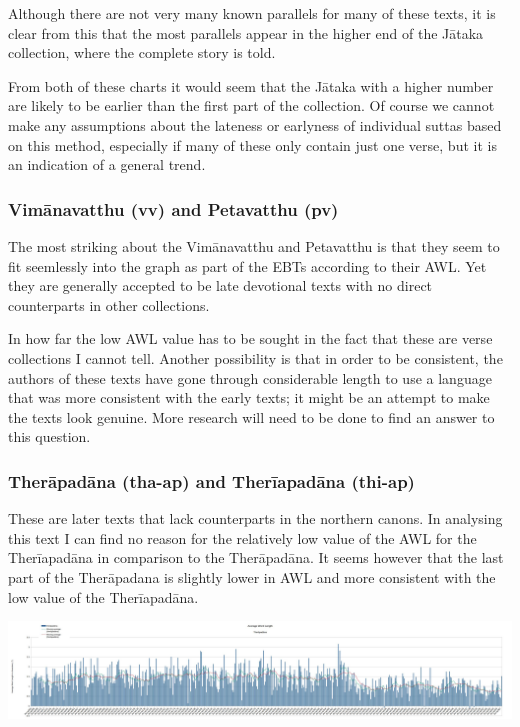 \medskip
Although there are not very many known parallels for many of these texts, it is clear from this that the most parallels appear in the higher end of the Jātaka collection, where the complete story is told.

From both of these charts it would seem that the Jātaka with a higher number are likely to be earlier than the first part of the collection. Of course we cannot make any assumptions about the lateness or earlyness of individual suttas based on this method, especially if many of these only contain just one verse, but it is an indication of a general trend.

\subsubsection{Vimānavatthu (vv) and Petavatthu (pv)}
The most striking about the Vimānavatthu and Petavatthu is that they seem to fit seemlessly into the graph as part of the EBTs according to their AWL. Yet they are generally accepted to be late devotional texts with no direct counterparts in other collections.

In how far the low AWL value has to be sought in the fact that these are verse collections I cannot tell. Another possibility is that in order to be consistent, the authors of these texts have gone through considerable length to use a language that was more consistent with the early texts; it might be an attempt to make the texts look genuine. More research will need to be done to find an answer to this question.

\subsubsection{Therāpadāna (tha-ap) and Therīapadāna (thi-ap)}
These are later texts that lack counterparts in the northern canons. In analysing this text I can find no reason for the relatively low value of the AWL for the Therīapadāna in comparison to the Therāpadāna. It seems however that the last part of the Therāpadana is slightly lower in AWL and more consistent with the low value of the Therīapadāna.

\includegraphics[width=\linewidth]{thaap.jpg}
\label{thaap}

